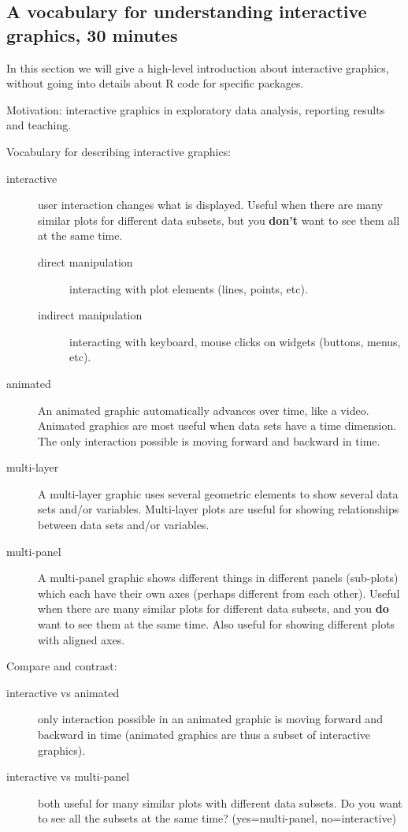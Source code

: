 \documentclass[11pt]{article}
\begin{document}
\subsection{A vocabulary for understanding interactive graphics, 30 minutes}
\label{sec:orgheadline7}

In this section we will give a high-level introduction about
interactive graphics, without going into details about R code for
specific packages.

Motivation: interactive graphics in exploratory data analysis,
reporting results and teaching.

Vocabulary for describing interactive graphics:
\begin{description}
\item[{interactive}] user interaction changes what is displayed. Useful
when there are many similar plots for different data subsets, but
you \textbf{don't} want to see them all at the same time.
\begin{description}
\item[{direct manipulation}] interacting with plot elements (lines,
points, etc).
\item[{indirect manipulation}] interacting with keyboard, mouse clicks
on widgets (buttons, menus, etc).
\end{description}
\item[{animated}] An animated graphic automatically advances over time,
like a video. Animated graphics are most useful when data sets
have a time dimension. The only interaction possible is moving
forward and backward in time.
\item[{multi-layer}] A multi-layer graphic uses several geometric elements
to show several data sets and/or variables. Multi-layer plots are
useful for showing relationships between data sets and/or
variables.
\item[{multi-panel}] A multi-panel graphic shows different things in
different panels (sub-plots) which each have their own axes
(perhaps different from each other). Useful when there are many
similar plots for different data subsets, and you \textbf{do} want to
see them at the same time. Also useful for showing different
plots with aligned axes.
\end{description}
Compare and contrast:
\begin{description}
\item[{interactive vs animated}] only interaction possible in an animated
graphic is moving forward and backward in time (animated graphics
are thus a subset of interactive graphics).
\item[{interactive vs multi-panel}] both useful for many similar plots
with different data subsets. Do you want to see all the subsets
at the same time? (yes=multi-panel, no=interactive)
\end{description}
\end{document}
